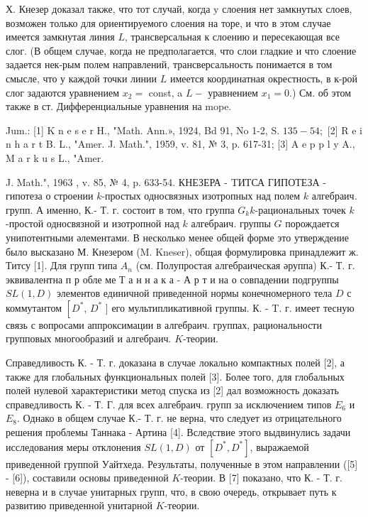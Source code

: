 \documentclass[10pt]{article}
\begin{document}
Х. Кнезер доказал также, что тот случай, когда $\mathrm{y}$ слоения нет замкнутых слоев, возможен только для ориентируемого слоения на торе, и что в этом случае имеется замкнутая линия $L$, трансверсальная к слоению и пересекающая все слог. (В общем случае, когда не предполагается, что слои гладкие и что слоение задается нек-рым полем направлений, трансверсальность понимается в том смысле, что у каждой точки линии $L$ имеется координатная окрестность, в к-рой слог задаются уравнением $x_{2}=$ const, a $L-$ уравнением $x_{1}=0$.) См. об этом также в ст. Дифференциальные уравнения на mope.



Jum.: [1] K n e s e r H., "Math. Ann.», 1924, Bd 91, No 1-2, S. $135-54 ;$ [2] R e i n h a r t B. L., "Amer. J. Math.", 1959, v. 81, № 3, p. 617-31; [3] A e p p l y A., M a r k u s L., "Amer.

J. Math.", 1963 , v. 85, № 4, p. 633-54. КНЕЗЕРА - TИТСА ГИПОТЕЗА - гипотеза о строении $k$-простых односвязных изотропных над полем $k$ алгебраич. групп. А именно, К.- Т. г. состоит в том, что группа $G_{k} k$-рациональных точек $k$-простой односвязной и изотропной над $k$ алгебраич. группы $G$ порождается унипотентными әлементами. В несколько менее общей форме это утверждение было высказано М. Кнезером (M. Kneser), общая формулировка принадлежит ж. Титсу [1]. Для групп типа $A_{n}$ (см. Полупростая алгебраическая әруппа) К.- Т. г. эквивалентна п р обле ме Т а н н а к а - А р т и на о совпадении подгруппы $S L(1, D)$ элементов единичной приведенной нормы конечномерного тела $D$ с коммутантом $\left[D^{*}\right.$, $D^{*}$ ] его мультипликативной группы. К. - T. г. имеет тесную связь с вопросами аппроксимации в алгебраич. группах, рациональности групповых многообразий и алгебраич. $K$-теории.



Справедливость К. - Т. г. доказана в случае локально компактных полей [2], а также для глобальных функциональных полей [3]. Более того, для глобальных полей нулевой характеристики метод спуска из [2] дал возможность доказать справедливость К. - Т. Г. для всех алгебраич. групп за исключением типов $E_{6}$ и $E_{8}$. Однако в общем случае К.- Т. г. не верна, что следует из отрицательного решения проблемы Таннака - Артина [4]. Вследствие этого выдвинулись задачи исследования меры отклонения $S L(1, D)$ от $\left[D^{*}, D^{*}\right]$, выражаемой приведенной группой Уайтхеда. Результаты, полученные в этом направлении ([5] - [6]), составили основы приведенной $K$-теории. В [7] показано, что К. - Т. г. неверна и в случае унитарных групп, что, в свою очередь, открывает путь к развитию приведенной унитарной $K$-теории.
\end{document}
